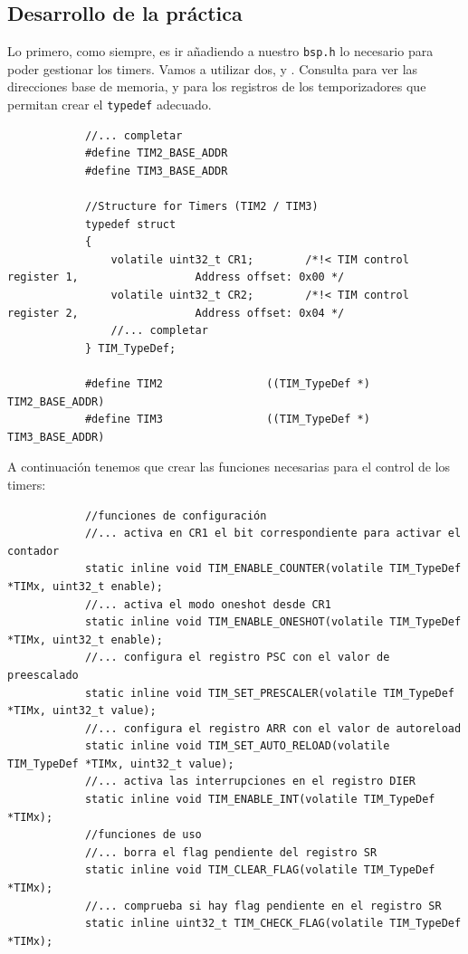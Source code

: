 \documentclass[../main.tex]{subfiles}
\begin{document}
    \subsection{Desarrollo de la práctica}

        Lo primero, como siempre, es ir añadiendo a nuestro \texttt{bsp.h} lo necesario para poder gestionar los timers. Vamos a utilizar dos,  y . Consulta \REFMAN[1.6] para ver las direcciones base de memoria, y \REFMAN[19.4] para los registros de los temporizadores que permitan crear el \lstinline|typedef| adecuado.

        \begin{lstlisting}
            //... completar
            #define TIM2_BASE_ADDR   
            #define TIM3_BASE_ADDR  

            //Structure for Timers (TIM2 / TIM3)
            typedef struct
            {
                volatile uint32_t CR1;        /*!< TIM control register 1,                  Address offset: 0x00 */
                volatile uint32_t CR2;        /*!< TIM control register 2,                  Address offset: 0x04 */
                //... completar
            } TIM_TypeDef;

            #define TIM2                ((TIM_TypeDef *) TIM2_BASE_ADDR)
            #define TIM3                ((TIM_TypeDef *) TIM3_BASE_ADDR)
        \end{lstlisting}

        A continuación tenemos que crear las funciones necesarias para el control de los timers:

        \begin{lstlisting}
            //funciones de configuración
            //... activa en CR1 el bit correspondiente para activar el contador
            static inline void TIM_ENABLE_COUNTER(volatile TIM_TypeDef *TIMx, uint32_t enable);
            //... activa el modo oneshot desde CR1
            static inline void TIM_ENABLE_ONESHOT(volatile TIM_TypeDef *TIMx, uint32_t enable);
            //... configura el registro PSC con el valor de preescalado
            static inline void TIM_SET_PRESCALER(volatile TIM_TypeDef *TIMx, uint32_t value);
            //... configura el registro ARR con el valor de autoreload
            static inline void TIM_SET_AUTO_RELOAD(volatile TIM_TypeDef *TIMx, uint32_t value);
            //... activa las interrupciones en el registro DIER
            static inline void TIM_ENABLE_INT(volatile TIM_TypeDef *TIMx);
            //funciones de uso
            //... borra el flag pendiente del registro SR
            static inline void TIM_CLEAR_FLAG(volatile TIM_TypeDef *TIMx);
            //... comprueba si hay flag pendiente en el registro SR
            static inline uint32_t TIM_CHECK_FLAG(volatile TIM_TypeDef *TIMx);
        \end{lstlisting}
\end{document}
